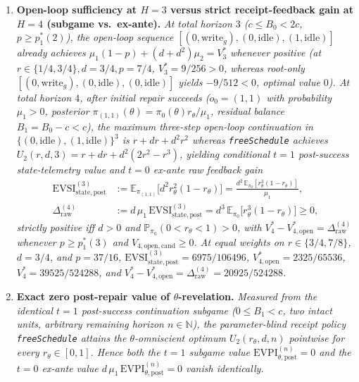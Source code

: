 \documentclass[11pt,a4paper]{article}
\begin{document}
\begin{enumerate}
{  exact loss \(3/640\) (and at \(p = 6/5 < 5/4\), \(m^* = 2\) becomes
  optimal with \(V_3^* = 89/640\)).}
\item
  \textbf{Open-loop sufficiency at \(H=3\) versus strict
  receipt-feedback gain at \(H=4\) (subgame vs.~ex-ante).} \emph{At
  total horizon \(3\) (\(c \le B_0 < 2c\), \(p \ge p_1^*(2)\)), the
  open-loop sequence
  \([(0, \mathrm{write}_g), (0, \mathrm{idle}), (1, \mathrm{idle})]\)
  already achieves \(\mu_1(1-p) + (d + d^2)\mu_2 = V_3^*\) whenever
  positive (at \(r \in \{1/4, 3/4\}, d = 3/4, p = 7/4\),
  \(V_3^* = 9/256 > 0\), whereas root-only
  \([(0, \mathrm{write}_g), (0, \mathrm{idle}), (0, \mathrm{idle})]\)
  yields \(-9/512 < 0\), optimal value \(0\)). At total horizon \(4\),
  after initial repair succeeds (\(o_0 = (1,1)\) with probability
  \(\mu_1 > 0\), posterior
  \(\pi_{(1,1)}(\theta) = \pi_0(\theta)r_\theta / \mu_1\), residual
  balance \(B_1 = B_0 - c < c\)), the maximum three-step open-loop
  continuation in \(\{(0, \mathrm{idle}), (1, \mathrm{idle})\}^3\) is
  \(r + dr + d^2 r^2\) whereas \texttt{freeSchedule} achieves
  \(U_2(r, d, 3) = r + dr + d^2(2r^2 - r^3)\), yielding conditional
  \(t = 1\) post-success state-telemetry value and \(t = 0\) ex-ante raw
  feedback gain} \[\begin{aligned}
  \mathrm{EVSI}_{\mathrm{state,post}}^{(3)} &:= \mathbb{E}_{\pi_{(1,1)}}\!\bigl[d^2 r_\theta^2(1 - r_\theta)\bigr] = \frac{d^2\,\mathbb{E}_{\pi_0}[r_\theta^3(1 - r_\theta)]}{\mu_1}, \\
  \Delta_{\mathrm{raw}}^{(4)} &:= d\,\mu_1\,\mathrm{EVSI}_{\mathrm{state,post}}^{(3)} = d^3\,\mathbb{E}_{\pi_0}\!\bigl[r_\theta^3(1 - r_\theta)\bigr] \ge 0,
  \end{aligned}\] \emph{strictly positive iff \(d > 0\) and
  \(\mathbb{P}_{\pi_0}(0 < r_\theta < 1) > 0\), with
  \(V_4^* - V_{4,\mathrm{open}}^* = \Delta_{\mathrm{raw}}^{(4)}\)
  whenever \(p \ge p_1^*(3)\) and \(V_{4,\mathrm{open,cand}} \ge 0\). At
  equal weights on \(r \in \{3/4, 7/8\}\), \(d = 3/4\), and
  \(p = 37/16\),
  \(\mathrm{EVSI}_{\mathrm{state,post}}^{(3)} = 6975 / 106496\),
  \(V_{4,\mathrm{open}}^* = 2325 / 65536\), \(V_4^* = 39525 / 524288\),
  and
  \(V_4^* - V_{4,\mathrm{open}}^* = \Delta_{\mathrm{raw}}^{(4)} = 20925 / 524288\).}
\item
  \textbf{Exact zero post-repair value of \(\theta\)-revelation.}
  \emph{Measured from the identical \(t = 1\) post-success continuation
  subgame (\(0 \le B_1 < c\), two intact units, arbitrary remaining
  horizon \(n \in \mathbb{N}\)), the parameter-blind receipt policy
  \texttt{freeSchedule} attains the \(\theta\)-omniscient optimum
  \(U_2(r_\theta, d, n)\) pointwise for every \(r_\theta \in [0,1]\).
  Hence both the \(t = 1\) subgame value
  \(\mathrm{EVPI}_{\theta,\mathrm{post}}^{(n)} = 0\) and the \(t = 0\)
  ex-ante value
  \(d\,\mu_1\,\mathrm{EVPI}_{\theta,\mathrm{post}}^{(n)} = 0\) vanish
  identically.}
\end{enumerate}
\end{document}
